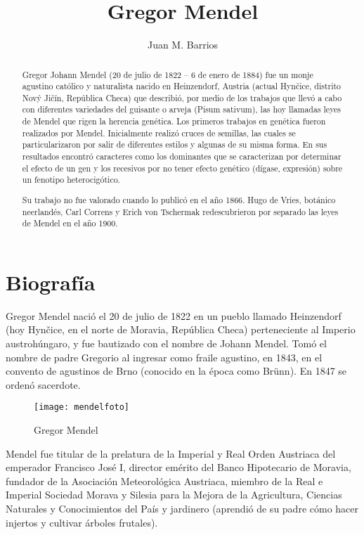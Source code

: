 \documentclass{report}
\title{Gregor Mendel}
\author{Juan M. Barrios}
\begin{document}
	
\maketitle

\begin{abstract}
Gregor Johann Mendel (20 de julio de 1822 – 6 de enero de 1884) fue un monje agustino católico y naturalista nacido en Heinzendorf, Austria (actual Hynčice, distrito Nový Jičín, República Checa) que describió, por medio de los trabajos que llevó a cabo con diferentes variedades del guisante o arveja (Pisum sativum), las hoy llamadas leyes de Mendel que rigen la herencia genética. Los primeros trabajos en genética fueron realizados por Mendel. Inicialmente realizó cruces de semillas, las cuales se particularizaron por salir de diferentes estilos y algunas de su misma forma. En sus resultados encontró caracteres como los dominantes que se caracterizan por determinar el efecto de un gen y los recesivos por no tener efecto genético (dígase, expresión) sobre un fenotipo heterocigótico.

Su trabajo no fue valorado cuando lo publicó en el año 1866. Hugo de Vries, botánico neerlandés, Carl Correns y Erich von Tschermak redescubrieron por separado las leyes de Mendel en el año 1900.\cite{Bowler2003}
\end{abstract}

\tableofcontents

\chapter{Biografía}
Gregor Mendel nació el 20 de julio de 1822 en un pueblo llamado Heinzendorf (hoy Hynčice, en el norte de Moravia, República Checa) perteneciente al Imperio austrohúngaro, y fue bautizado con el nombre de Johann Mendel. Tomó el nombre de padre Gregorio al ingresar como fraile agustino, en 1843, en el convento de agustinos de Brno (conocido en la época como Brünn). En 1847 se ordenó sacerdote.

\begin{figure}[h!]
	\centering
	\texttt{[image: mendelfoto]}
	\caption{Gregor Mendel}
\end{figure}

Mendel fue titular de la prelatura de la Imperial y Real Orden Austriaca del emperador Francisco José I, director emérito del Banco Hipotecario de Moravia, fundador de la Asociación Meteorológica Austriaca, miembro de la Real e Imperial Sociedad Morava y Silesia para la Mejora de la Agricultura, Ciencias Naturales y Conocimientos del País y jardinero (aprendió de su padre cómo hacer injertos y cultivar árboles frutales).
\end{document}
